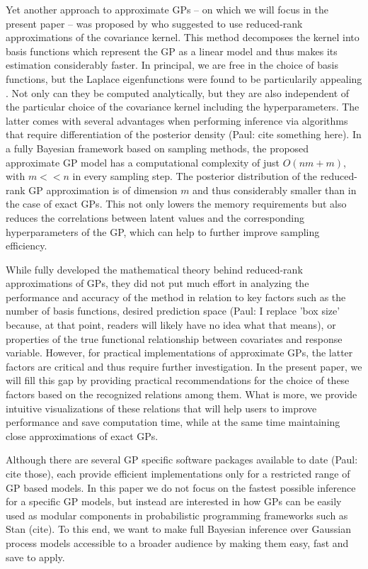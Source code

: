 \documentclass[]{interact}
\theoremstyle{plain}%
\theoremstyle{definition}
\theoremstyle{remark}
\begin{document}
Yet another approach to approximate GPs -- on which we will focus in the present paper -- was proposed by \cite{solin2018hilbert} who suggested to use reduced-rank approximations of the covariance kernel. This method decomposes the kernel into basis functions which represent the GP as a linear model and thus makes its estimation considerably faster. In principal, we are free in the choice of basis functions, but the Laplace eigenfunctions were found to be particularily appealing \citep{solin2018hilbert}. Not only can they be computed analytically, but they are also independent of the particular choice of the covariance kernel including the hyperparameters. The latter comes with several advantages when performing inference via algorithms that require differentiation of the posterior density (Paul: cite something here). In a fully Bayesian framework based on sampling methods, the proposed approximate GP model has a computational complexity of just $O(nm+m)$, with $m<<n$ in every sampling step. The posterior distribution of the reduced-rank GP approximation is of dimension $m$ and thus considerably smaller than in the case of exact GPs. This not only lowers the memory requirements but also reduces the correlations between latent values and the corresponding hyperparameters of the GP, which can help to further improve sampling efficiency.

While \cite{solin2018hilbert} fully developed the mathematical theory behind reduced-rank approximations of GPs, they did not put much effort in analyzing the performance and accuracy of the method in relation to key factors such as the number of basis functions, desired prediction space (Paul: I replace 'box size' because, at that point, readers will likely have no idea what that means), or properties of the true functional relationship between covariates and response variable. However, for practical implementations of approximate GPs, the latter factors are critical and thus require further investigation. In the present paper, we will fill this gap by providing practical recommendations for the choice of these factors based on the recognized relations among them. What is more, we provide intuitive visualizations of these relations that will help users to improve performance and save computation time, while at the same time maintaining close approximations of exact GPs. 

Although there are several GP specific software packages available to date (Paul: cite those), each provide efficient implementations only for a restricted range of GP based models. In this paper we do not focus on the fastest possible inference for a specific GP models, but instead are interested in how GPs can be easily used as modular components in probabilistic programming frameworks such as Stan (cite). To this end, we want to make full Bayesian inference over Gaussian process models accessible to a broader audience by making them easy, fast and save to apply. 
\end{document}
